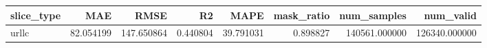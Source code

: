 \begin{tabular}{lrrrrrrr}
\toprule
slice_type & MAE & RMSE & R2 & MAPE & mask_ratio & num_samples & num_valid \\
\midrule
urllc & 82.054199 & 147.650864 & 0.440804 & 39.791031 & 0.898827 & 140561.000000 & 126340.000000 \\
\bottomrule
\end{tabular}
